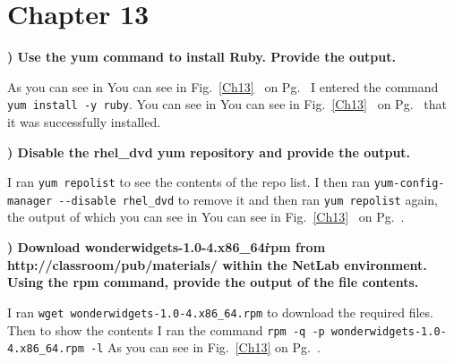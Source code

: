 \documentclass{report}
\title{\classinfo}
\author{\semester}
\date{\today}
\newcommand{\mysection}[1]{\section*{#1}}
\newcommand{\mysubsection}[2]{\textbf{\romannumeral #1) #2}}
\begin{document}
\maketitle

\mysection{\textbf{ Chapter 13 }}


\mysubsection{1}{Use the yum command to install Ruby. Provide the output.}


As you can see in You can see in Fig.~\ref{Ch13}~ 
on Pg.~\pageref{Ch13}  I entered the command 
{\scriptsize{\verb$yum install -y ruby$}\normalsize}.
You can see in You can see in Fig.~\ref{Ch13}~ 
on Pg.~\pageref{Ch13} that it was successfully installed.
\hfill\break


\noindent\mysubsection{2}{Disable the rhel\_dvd yum repository and provide the output.}


I ran {\scriptsize{\verb$yum repolist$}\normalsize} to see the contents of the
repo list. I then 
ran {\scriptsize{\verb$yum-config-manager --disable rhel_dvd$}\normalsize} 
to remove it and then ran {\scriptsize{\verb$yum repolist$}\normalsize} again,
the output of which you can see in You can see in Fig.~\ref{Ch13}~ 
on Pg.~\pageref{Ch13}. 
\hfill\break


\noindent\mysubsection{3}{Download wonderwidgets-1.0-4.x86\_64\.rpm from http://classroom/pub/materials/ within the NetLab environment. Using the rpm command, provide the output of the file contents.}


I ran {\scriptsize{\verb$wget wonderwidgets-1.0-4.x86_64.rpm$}\normalsize} to
download the required files. Then to show the contents I ran the command
{\scriptsize{\verb$rpm -q -p wonderwidgets-1.0-4.x86_64.rpm -l$}\normalsize} 
As you can see in Fig.~\ref{Ch13} on Pg.~\pageref{Ch13}.
\hfill\break
\end{document}
